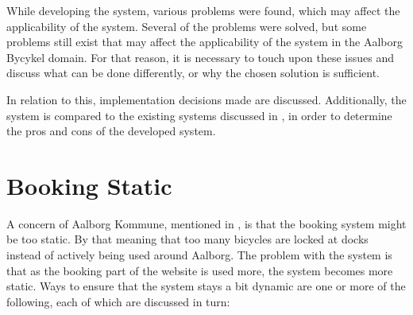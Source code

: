 While developing the system, various problems were found, which may affect the applicability of the system.
Several of the problems were solved, but some problems still exist that may affect the applicability of the system in the Aalborg Bycykel domain.
For that reason, it is necessary to touch upon these issues and discuss what can be done differently, or why the chosen solution is sufficient.

In relation to this, implementation decisions made are discussed.
Additionally, the system is compared to the existing systems discussed in , in order to determine the pros and cons of the developed system.

\section*{Booking Static}
A concern of Aalborg Kommune, mentioned in , is that the booking system might be too static.
By that meaning that too many bicycles are locked at docks instead of actively being used around Aalborg.
The problem with the system is that as the booking part of the website is used more, the system becomes more static.
Ways to ensure that the system stays a bit dynamic are one or more of the following, each of which are discussed in turn:

